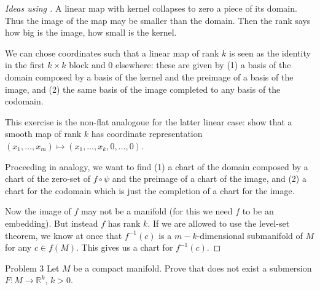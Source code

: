 \begin{proof}[Ideas using \cite{lee}]\leavevmode
	A linear map with kernel collapses to zero a piece of its domain. Thus the image of the map may be smaller than the domain. Then the rank says how big is the image, how small is the kernel.

	We can chose coordinates such that a linear map of rank \(k\) is seen as the identity in the first \(k\times k\) block and 0 elsewhere: these are given by (1) a basis of the domain composed by a basis of the kernel and the preimage of a basis of the image, and (2) the same basis of the image completed to any basis of the codomain.

	This exercise is the non-flat analogoue for the latter linear case: show that a smooth map of rank \(k\) has coordinate representation \((x_1,\ldots,x_m) \mapsto (x_1,\ldots,x_k,0,\ldots,0)\).

	Proceeding in analogy, we want to find (1) a chart of the domain composed by a chart of the zero-set of \(f \circ \psi\) and the preimage of a chart of the image, and (2) a chart for the codomain which is just the completion of a chart for the image.

	Now the image of $f$ may not be a manifold (for this we need $f$ to be an embedding). But instead $f$ has rank \(k\). If we are allowed to use the level-set theorem, we know at once that \(f^{-1}(c)\) is a \(m-k\)-dimensional submanifold of \(M\) for any \(c \in f(M)\). This gives us a chart for \(f^{-1}(c)\).

	


\end{proof}\fi

\clearpage\begin{thing1}{Problem 3}\label{p:3}\leavevmode
Let \(M\) be a compact manifold. Prove that does not exist a submersion \(F: M \to \mathbb{R}^k\), \(k>0\).
\end{thing1}

